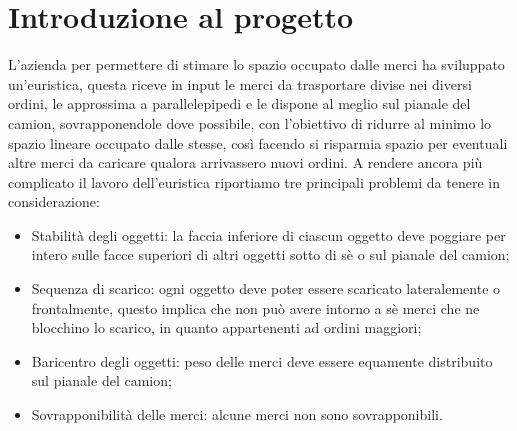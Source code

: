 \section{Introduzione al progetto}
L'azienda per permettere di stimare lo spazio occupato dalle merci ha sviluppato un'euristica, questa riceve in input le merci da trasportare divise nei diversi ordini, le approssima a parallelepipedi e le dispone al meglio sul pianale del camion, sovrapponendole dove possibile, con l'obiettivo di ridurre al minimo lo spazio lineare occupato dalle stesse, così facendo si risparmia spazio per eventuali altre merci da caricare qualora arrivassero nuovi ordini.
A rendere ancora più complicato il lavoro dell'euristica riportiamo tre principali problemi da tenere in considerazione:
\begin{itemize}
	\item Stabilità degli oggetti: la faccia inferiore di ciascun oggetto deve poggiare per intero sulle facce superiori di altri oggetti sotto di sè o sul pianale del camion;
	\item Sequenza di scarico: ogni oggetto deve poter essere scaricato lateralemente o frontalmente, questo implica che non può avere intorno a sè merci che ne blocchino lo scarico, in quanto appartenenti ad ordini maggiori;
	\item Baricentro degli oggetti: peso delle merci deve essere equamente distribuito sul pianale del camion;
	\item Sovrapponibilità delle merci: alcune merci non sono sovrapponibili.
\end{itemize}

